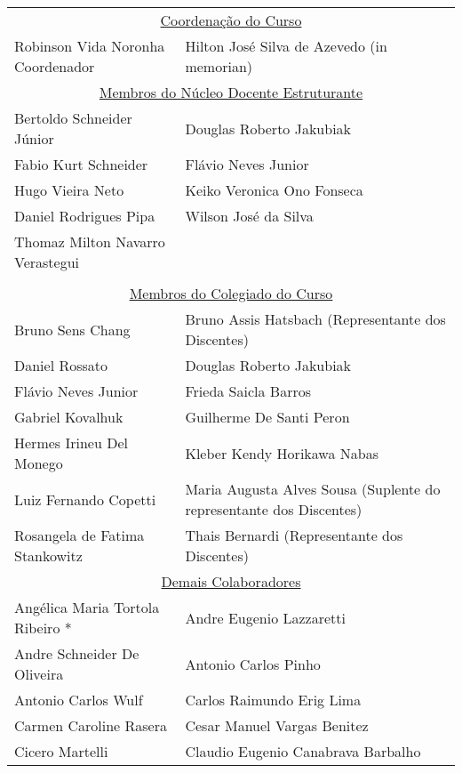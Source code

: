 {\vspace{5mm}
\begin{tabular}{ p{8cm} p{8cm} }
\multicolumn{2}{c}{\large{\underline{Coordenação do Curso}}}\\
Robinson Vida Noronha \newline \scriptsize{Coordenador} & Hilton José Silva de Azevedo \newline \scriptsize{ (in memorian) } \\
\multicolumn{2}{c}{\large{\underline{Membros do Núcleo Docente Estruturante}}}\\
Bertoldo Schneider Júnior & Douglas Roberto Jakubiak \\
Fabio Kurt Schneider & Flávio Neves Junior\\
Hugo Vieira Neto & Keiko Veronica Ono Fonseca\\
Daniel Rodrigues Pipa & Wilson José da Silva\\
Thomaz Milton Navarro Verastegui & \\
& \\
\multicolumn{2}{c}{\large{\underline{Membros do Colegiado do Curso}}}\\
Bruno Sens Chang & Bruno Assis Hatsbach \newline \scriptsize{ (Representante dos Discentes) }\\
Daniel Rossato & Douglas Roberto Jakubiak \\
Flávio Neves Junior & Frieda Saicla Barros\\
Gabriel Kovalhuk & Guilherme De Santi Peron \\
Hermes Irineu Del Monego & Kleber Kendy Horikawa Nabas\\
Luiz Fernando Copetti & Maria Augusta Alves Sousa \newline \scriptsize{ (Suplente do representante dos Discentes) } \\
Rosangela de Fatima Stankowitz & Thais Bernardi \newline \scriptsize{ (Representante dos Discentes) } \\
\multicolumn{2}{c}{\large{\underline{Demais Colaboradores}}}\\
Angélica Maria Tortola Ribeiro * & Andre Eugenio Lazzaretti \\
Andre Schneider De Oliveira & Antonio Carlos Pinho \\
Antonio Carlos Wulf & Carlos Raimundo Erig Lima \\
Carmen Caroline Rasera & Cesar Manuel Vargas Benitez \\
Cicero Martelli & Claudio Eugenio Canabrava Barbalho \\

\end{tabular}}
